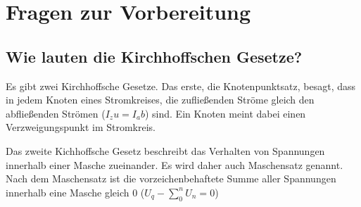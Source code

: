 \section{Fragen zur Vorbereitung}
\subsection{Wie lauten die Kirchhoffschen Gesetze?}
Es gibt zwei Kirchhoffsche Gesetze. Das erste, die Knotenpunktsatz, besagt, dass in jedem Knoten eines Stromkreises, die zufließenden Ströme gleich den abfließenden Strömen ($I_zu = I_ab$) sind. Ein Knoten meint dabei einen Verzweigungspunkt im Stromkreis.

Das zweite Kichhoffsche Gesetz beschreibt das Verhalten von Spannungen innerhalb einer Masche zueinander. Es wird daher auch Maschensatz genannt. Nach dem Maschensatz ist die vorzeichenbehaftete Summe aller Spannungen innerhalb eine Masche gleich 0 ($U_q - \sum_{0}^{n} U_n = 0$)